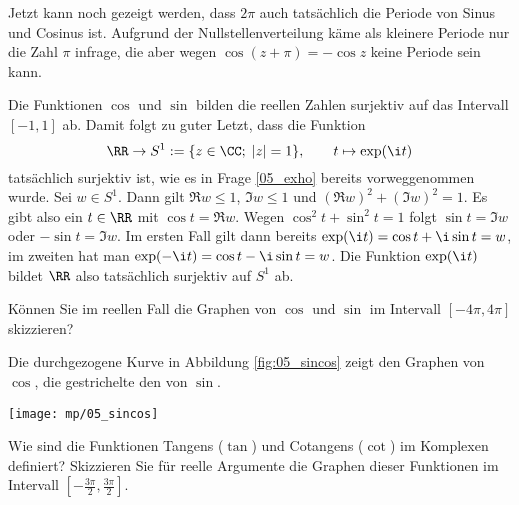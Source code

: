 \begin{antwort}
  \medskip
  \noindent
   Jetzt kann noch gezeigt werden, dass $2\pi$ 
  auch tatsächlich die  Periode von Sinus und Cosinus 
  ist. Aufgrund der Nullstellenverteilung käme als kleinere Periode 
  nur die Zahl $\pi$ infrage, die aber wegen $\cos(z+\pi) = -\cos z$ 
  keine Periode sein kann. 

  \medskip
  \noindent
   Die Funktionen $\cos$ und $\sin$ 
  bilden die reellen Zahlen surjektiv auf das Intervall $[-1,1]$ ab. 
  Damit folgt zu guter Letzt, dass die Funktion
  \[
  \RR \to S^1 := \{ z\in\CC;\; |z|=1 \}, \qquad t\mapsto \exp(\i t)
  \]
  tatsächlich surjektiv ist, wie es in Frage \ref{05_exho} 
  bereits vorweggenommen wurde. 
  Sei $w\in S^1$. Dann gilt $\Re w \le 1$, $\Im w \le 1$ und 
  $(\Re w)^2+ (\Im w)^2=1$. Es gibt also ein $ t\in \RR$ mit 
  $\cos t=\Re w$. Wegen $\cos^2 t+\sin^2 t=1$ folgt $\sin t=\Im w$ oder 
  $-\sin t=\Im w$. Im ersten Fall gilt dann bereits 
  $\exp(\i t)=\cos t+ \i\sin t=w$, 
  im zweiten hat man $\exp(-\i t)=\cos t - \i\sin t=w$. 
  Die Funktion $\exp(\i t)$ bildet $\RR$ also tatsächlich surjektiv auf $S^1$ ab.
  \AntEnd 
\end{antwort} 

\begin{frage}
  Können Sie im reellen Fall die Graphen von $\cos$ und $\sin$ 
  im Intervall $[-4\pi,4\pi]$ skizzieren?
\end{frage}

\begin{antwort}
  Die durchgezogene Kurve in Abbildung \ref{fig:05_sincos} zeigt den Graphen 
  von $\cos$, die gestrichelte den von $\sin$.\AntEnd
  \begin{center}
    \texttt{[image: mp/05\_sincos]}
    \label{fig:05_sincos}
  \end{center}
\end{antwort}

\begin{frage}\label{05_tangens}
  Wie sind die Funktionen Tangens ($\tan$) und Cotangens ($\cot$) im Komplexen 
  definiert? Skizzieren Sie für reelle Argumente die Graphen dieser Funktionen 
  im Intervall $\left[-\frac{3\pi}{2}, \frac{3\pi}{2} \right]$. 
\end{frage}

